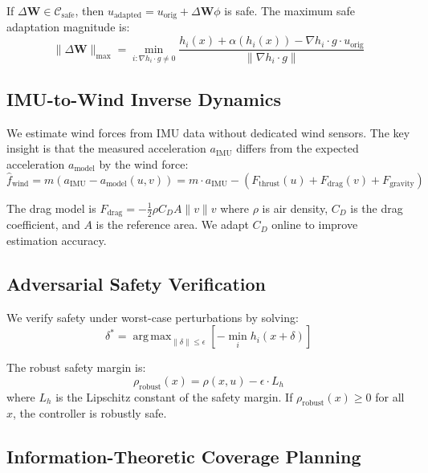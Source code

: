 \documentclass[11pt,twocolumn]{article}
\theoremstyle{definition}
\newcommand{\cC}{\mathcal{C}}
\newcommand{\mat}[1]{\mathbf{#1}}
\DeclareMathOperator*{\argmax}{arg\,max}
\begin{document}
If $\Delta \mat{W} \in \cC_{\text{safe}}$, then $u_{\text{adapted}} = u_{\text{orig}} + \Delta \mat{W} \phi$ is safe. The maximum safe adaptation magnitude is:
\begin{equation}
\|\Delta \mat{W}\|_{\max} = \min_{i: \nabla h_i \cdot g \neq 0} \frac{h_i(x) + \alpha(h_i(x)) - \nabla h_i \cdot g \cdot u_{\text{orig}}}{\|\nabla h_i \cdot g\|}
\end{equation}

\subsection{IMU-to-Wind Inverse Dynamics}
\label{sec:inverse_dynamics}

We estimate wind forces from IMU data without dedicated wind sensors. The key insight is that the measured acceleration $a_{\text{IMU}}$ differs from the expected acceleration $a_{\text{model}}$ by the wind force:
\begin{equation}
\label{eq:wind_estimate}
\hat{f}_{\text{wind}} = m(a_{\text{IMU}} - a_{\text{model}}(u, v)) = m \cdot a_{\text{IMU}} - (F_{\text{thrust}}(u) + F_{\text{drag}}(v) + F_{\text{gravity}})
\end{equation}

The drag model is $F_{\text{drag}} = -\frac{1}{2}\rho C_D A \|v\| v$ where $\rho$ is air density, $C_D$ is the drag coefficient, and $A$ is the reference area. We adapt $C_D$ online to improve estimation accuracy.

\subsection{Adversarial Safety Verification}
\label{sec:adversarial}

We verify safety under worst-case perturbations by solving:
\begin{equation}
\label{eq:adversarial}
\delta^* = \argmax_{\|\delta\| \leq \epsilon} \left[-\min_i h_i(x + \delta)\right]
\end{equation}

The robust safety margin is:
\begin{equation}
\rho_{\text{robust}}(x) = \rho(x, u) - \epsilon \cdot L_h
\end{equation}
where $L_h$ is the Lipschitz constant of the safety margin. If $\rho_{\text{robust}}(x) \geq 0$ for all $x$, the controller is robustly safe.

\subsection{Information-Theoretic Coverage Planning}
\label{sec:info_planning}
\end{document}
